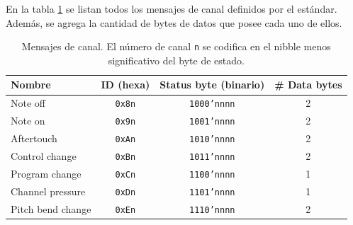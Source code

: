 En la tabla \ref{tab:channel-messages} se listan todos los mensajes de canal definidos por el estándar. Además, se agrega la cantidad de bytes de datos que posee cada uno de ellos.
\begin{table}[h]
	\centering
	\caption[Mensajes de canal.]{Mensajes de canal. El número de canal \texttt{n} se codifica en el nibble menos significativo del byte de estado.}
	\label{tab:channel-messages}
	\begin{tabular}{lccc}
		\toprule
		\textbf{Nombre}   & \textbf{ID (hexa)} & \textbf{Status byte (binario)} & \textbf{\# Data bytes} \\
		\midrule
		Note off          & \texttt{0x8n}       & \texttt{1000'nnnn}              & 2                      \\
		Note on           & \texttt{0x9n}       & \texttt{1001'nnnn}              & 2                      \\
		Aftertouch        & \texttt{0xAn}       & \texttt{1010'nnnn}              & 2                      \\
		Control change    & \texttt{0xBn}       & \texttt{1011'nnnn}              & 2                      \\
		Program change    & \texttt{0xCn}       & \texttt{1100'nnnn}              & 1                      \\
		Channel pressure  & \texttt{0xDn}       & \texttt{1101'nnnn}              & 1                      \\
		Pitch bend change & \texttt{0xEn}       & \texttt{1110'nnnn}              & 2                      \\
		\bottomrule
		\hline
	\end{tabular}
\end{table}

